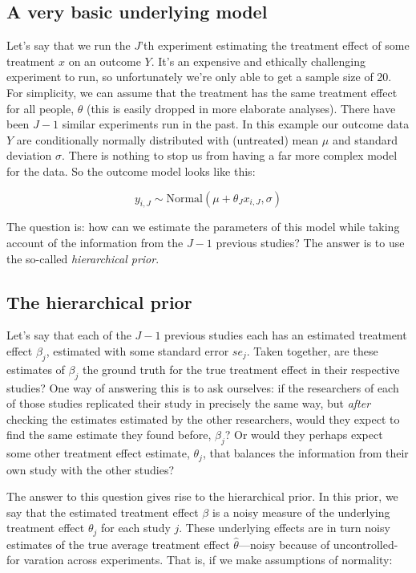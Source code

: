 \documentclass[]{book}
\begin{document}
\subsection{A very basic underlying
model}\label{a-very-basic-underlying-model}

Let's say that we run the \(J\)'th experiment estimating the treatment
effect of some treatment \(x\) on an outcome \(Y\). It's an expensive
and ethically challenging experiment to run, so unfortunately we're only
able to get a sample size of 20. For simplicity, we can assume that the
treatment has the same treatment effect for all people, \(\theta\) (this
is easily dropped in more elaborate analyses). There have been \(J-1\)
similar experiments run in the past. In this example our outcome data
\(Y\) are conditionally normally distributed with (untreated) mean
\(\mu\) and standard deviation \(\sigma\). There is nothing to stop us
from having a far more complex model for the data. So the outcome model
looks like this:

\[
y_{i, J} \sim \mbox{Normal}(\mu + \theta_{J} x_{i,J}, \sigma)
\]

The question is: how can we estimate the parameters of this model while
taking account of the information from the \(J-1\) previous studies? The
answer is to use the so-called \emph{hierarchical prior}.

\subsection{The hierarchical prior}\label{the-hierarchical-prior}

Let's say that each of the \(J-1\) previous studies each has an
estimated treatment effect \(\beta_{j}\), estimated with some standard
error \(se_{j}\). Taken together, are these estimates of \(\beta_{j}\)
the ground truth for the true treatment effect in their respective
studies? One way of answering this is to ask ourselves: if the
researchers of each of those studies replicated their study in precisely
the same way, but \emph{after} checking the estimates estimated by the
other researchers, would they expect to find the same estimate they
found before, \(\beta_{j}\)? Or would they perhaps expect some other
treatment effect estimate, \(\theta_{j}\), that balances the information
from their own study with the other studies?

The answer to this question gives rise to the hierarchical prior. In
this prior, we say that the estimated treatment effect \(\beta\) is a
noisy measure of the underlying treatment effect \(\theta_{j}\) for each
study \(j\). These underlying effects are in turn noisy estimates of the
true average treatment effect \(\hat{\theta}\)---noisy because of
uncontrolled-for varation across experiments. That is, if we make
assumptions of normality:
\end{document}
